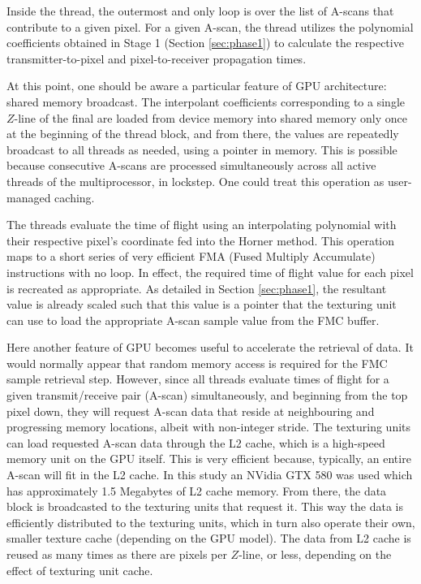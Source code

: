 Inside the thread, the outermost and only loop is over the list of A-scans that contribute to a given pixel. For a given A-scan, the thread utilizes the polynomial coefficients obtained in Stage 1 (Section \ref{sec:phase1}) to calculate the respective transmitter-to-pixel and pixel-to-receiver propagation times. 

At this point, one should be aware a particular feature of GPU architecture: shared memory broadcast. The interpolant coefficients corresponding to a single $Z$-line of the final are loaded from device memory into shared memory only once at the beginning of the thread block, and from there, the values are repeatedly broadcast to all threads as needed, using a pointer in memory. This is possible because consecutive A-scans are processed simultaneously across all active threads of the multiprocessor, in lockstep. One could treat this operation as user-managed caching.

The threads evaluate the time of flight using an interpolating polynomial with their respective pixel's coordinate fed into the Horner method\cite{dorn_generalizations_1962}. This operation maps to a short series of very efficient FMA (Fused Multiply Accumulate) instructions with no loop. In effect, the required time of flight value for each pixel is recreated as appropriate. As detailed in Section \ref{sec:phase1}, the resultant value is already scaled such that this value is a pointer that the texturing unit can use to load the appropriate A-scan sample value from the FMC buffer. 

Here another feature of GPU becomes useful to accelerate the retrieval of data. It would normally appear that random memory access is required for the FMC sample retrieval step. However, since all threads evaluate times of flight for a given transmit/receive pair (A-scan) simultaneously, and beginning from the top pixel down, they will request A-scan data that reside at neighbouring and progressing memory locations, albeit with non-integer stride. The texturing units can load requested A-scan data through the L2 cache, which is a high-speed memory unit on the GPU itself. This is very efficient because, typically, an entire A-scan will fit in the L2 cache. In this study an NVidia GTX 580 was used which has approximately 1.5 Megabytes of L2 cache memory. From there, the data block is broadcasted to the texturing units that request it. This way the data is efficiently distributed to the texturing units, which in turn also operate their own, smaller texture cache (depending on the GPU model). The data from L2 cache is reused as many times as there are pixels per $Z$-line, or less, depending on the effect of texturing unit cache.

